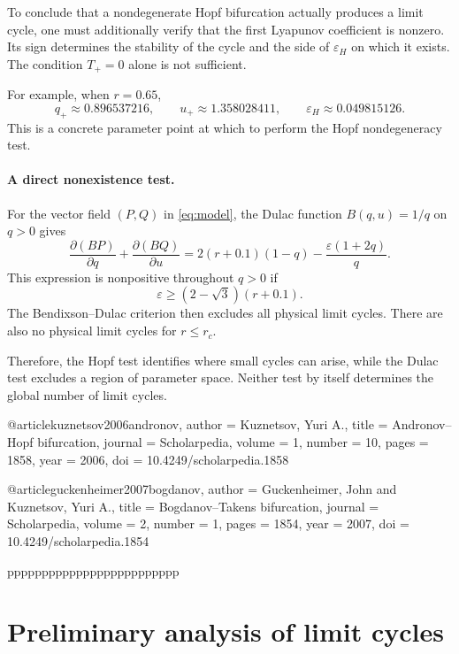 \documentclass[11pt,reqno]{amsart}
\theoremstyle{plain}
\theoremstyle{definition}
\theoremstyle{remark}
\begin{document}
To conclude that a nondegenerate Hopf bifurcation
actually produces a limit cycle, one must additionally
verify that the first Lyapunov coefficient is nonzero.
Its sign determines the stability of the cycle and
the side of $\varepsilon_H$ on which it exists.
The condition $T_+=0$ alone is not sufficient.

For example, when $r=0.65$,
\[
q_+\approx0.896537216,
\qquad
u_+\approx1.358028411,
\qquad
\varepsilon_H\approx0.049815126.
\]
This is a concrete parameter point at which to perform
the Hopf nondegeneracy test.

\paragraph{A direct nonexistence test.}
For the vector field $(P,Q)$ in \eqref{eq:model},
the Dulac function $B(q,u)=1/q$ on $q>0$ gives
\[
\frac{\partial(BP)}{\partial q}
+\frac{\partial(BQ)}{\partial u}
=
2(r+0.1)(1-q)-\frac{\varepsilon(1+2q)}q.
\]
This expression is nonpositive throughout $q>0$ if
\[
\boxed{
\varepsilon\geq(2-\sqrt3)(r+0.1).
}
\]
The Bendixson--Dulac criterion then excludes all
physical limit cycles. There are also no physical
limit cycles for $r\leq r_c$.

Therefore, the Hopf test identifies where small cycles
can arise, while the Dulac test excludes a region of
parameter space. Neither test by itself determines
the global number of limit cycles.

@article{kuznetsov2006andronov,
  author  = {Kuznetsov, Yuri A.},
  title   = {{Andronov--Hopf} bifurcation},
  journal = {Scholarpedia},
  volume  = {1},
  number  = {10},
  pages   = {1858},
  year    = {2006},
  doi     = {10.4249/scholarpedia.1858}
}

@article{guckenheimer2007bogdanov,
  author  = {Guckenheimer, John and Kuznetsov, Yuri A.},
  title   = {{Bogdanov--Takens} bifurcation},
  journal = {Scholarpedia},
  volume  = {2},
  number  = {1},
  pages   = {1854},
  year    = {2007},
  doi     = {10.4249/scholarpedia.1854}
}












ppppppppppppppppppppppppp

\section{Preliminary analysis of limit cycles}
\label{sec:preliminaries}
\end{document}
